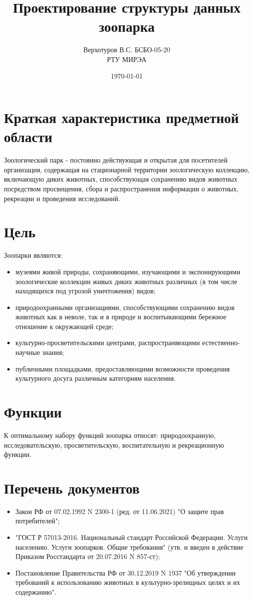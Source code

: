 \documentclass[12pt,a4paper]{article}
\title{Проектирование структуры данных зоопарка}
\author{Верхотуров В.С. БСБО-05-20 \\ РТУ МИРЭА}
\date{\today}
\begin{document}
\maketitle

\section{Краткая характеристика предметной области}

Зоологический парк - постоянно действующая и открытая для посетителей организация, содержащая на стационарной территории зоологическую коллекцию, включающую диких животных, способствующая сохранению видов животных посредством просвещения, сбора и распространения информации о животных, рекреации и проведения исследований.


\section{Цель}
Зоопарки являются:
\begin{itemize}
    \item музеями живой природы, сохраняющими, изучающими и экспонирующими зоологические коллекции живых диких животных различных (в том числе находящихся под угрозой уничтожения) видов;
    \item природоохранными организациями, способствующими сохранению видов животных как в неволе, так и в природе и воспитывающими бережное отношение к окружающей среде;
    \item культурно-просветительскими центрами, распространяющими естественно-научные знания;
    \item публичными площадками, предоставляющими возможности проведения культурного досуга различным категориям населения.
\end{itemize}

\section{Функции}
К оптимальному набору функций зоопарка относят: природоохранную, исследовательскую, просветительскую, воспитательную и рекреационную функции.

\section{Перечень документов}
\begin{itemize}
    \item Закон РФ от 07.02.1992 N 2300-1 (ред. от 11.06.2021) "О защите прав потребителей";
    \item "ГОСТ Р 57013-2016. Национальный стандарт Российской Федерации. Услуги населению. Услуги зоопарков. Общие требования" (утв. и введен в действие Приказом Росстандарта от 20.07.2016 N 857-ст);
    \item Постановление Правительства РФ от 30.12.2019 N 1937 "Об утверждении требований к использованию животных в культурно-зрелищных целях и их содержанию".
\end{itemize}
\end{document}
